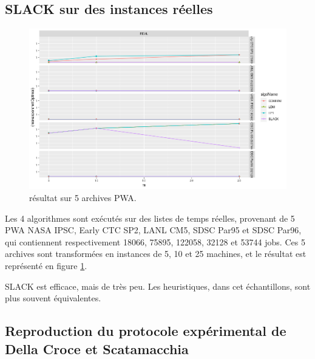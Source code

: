 \documentclass[a4paper,12pt]{report}
\theoremstyle{plain}				%
\theoremstyle{definition}				%
\begin{document}
  
\subsection{SLACK sur des instances réelles}
\label{ssec:resultatsSLACKReel}

\begin{figure}
{\centering
\includegraphics[width=\columnwidth]{2_Resultat_reel.png}
\caption{résultat sur 5 archives PWA.}
\label{fig:resultat5PWA}
\par}
\end{figure}
 
 Les 4 algorithmes sont exécutés sur des listes de temps réelles, provenant de 5 PWA NASA IPSC, Early CTC SP2, LANL CM5, SDSC Par95 et SDSC Par96, qui contiennent respectivement 18066, 75895, 122058, 32128 et 53744 jobs. Ces 5 archives sont transformées en instances de 5, 10 et 25 machines, et le résultat est représenté en figure \ref{fig:resultat5PWA}.
 
SLACK est efficace, mais de très peu. 
Les heuristiques, dans cet échantillons, sont plus souvent équivalentes.  
 
\subsection{Reproduction du protocole expérimental de Della Croce et Scatamacchia}
\label{ssec:resultatsReroductionPrtocoleExperimentalDellaCroceScatamacchia}
 
\end{document}
